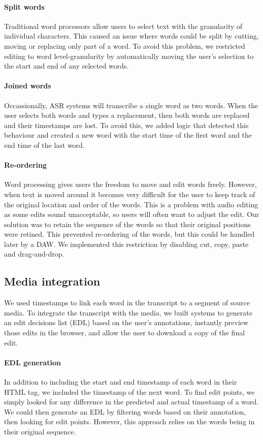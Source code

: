 \paragraph{Split words}
Traditional word processors allow users to select text with the granularity of individual characters. This caused an
issue where words could be split by cutting, moving or replacing only part of a word. To avoid this problem, we
restricted editing to word level-granularity by automatically moving the user's selection to the start and end of any
selected words.

\paragraph{Joined words}
Occassionally, ASR systems will transcribe a single word as two words. When the user selects both words and types a
replacement, then both words are replaced and their timestamps are lost. To avoid this, we added logic that detected
this behaviour and created a new word with the start time of the first word and the end time of the last word.

\paragraph{Re-ordering}
Word processing gives users the freedom to move and edit words freely.  However, when text is moved around it becomes
very difficult for the user to keep track of the original location and order of the words. This is a problem with audio
editing as some edits sound unacceptable, so users will often want to adjust the edit.
Our solution was to retain the sequence of the words so that their original positions were retined. This prevented
re-ordering of the words, but this could be handled later by a DAW.  We implemented this restriction by disabling cut,
copy, paste and drag-and-drop.

\subsection{Media integration}

We used timestamps to link each word in the transcript to a segment of source media.  To integrate the transcript with
the media, we built systems to generate an edit decisions list (EDL) based on the user's annotations, instantly preview
those edits in the browser, and allow the user to download a copy of the final edit.

\paragraph{EDL generation}
In addition to including the start and end timestamp of each word in their HTML tag, we included the timestamp of the
next word. To find edit points, we simply looked for any difference in the predicted and actual timestamp of a word.
We could then generate an EDL by filtering words based on their annotation, then looking for edit points. However, this
approach relies on the words being in their original sequence.

